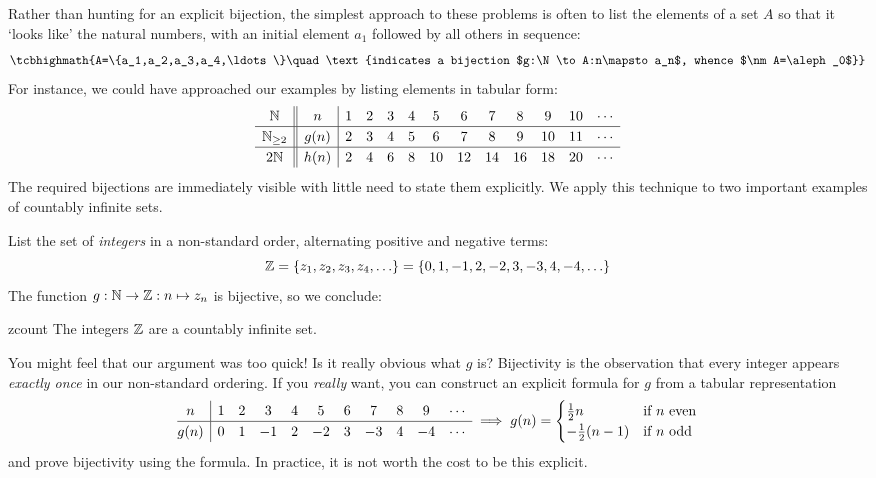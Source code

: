 Rather than hunting for an explicit bijection, the simplest approach to these problems is often to list the elements of a set $A$ so that it `looks like' the natural numbers, with an initial element $a_1$ followed by all others in sequence:
\[
	\tcbhighmath{A=\{a_1,a_2,a_3,a_4,\ldots\}\quad \text{indicates a bijection $g:\N\to A:n\mapsto a_n$, whence $\nm A=\aleph_0$}}
\]
For instance, we could have approached our examples by listing elements in tabular form:
\[
	\def\arraystretch{1.2}
	\begin{array}{c||c|ccccccccccc}
 		\N&n&1&2&3&4&5&6&7&8&9&10&\cdots\\\hline
 		\N_{\ge 2}&g(n)&2&3&4&5&6&7&8&9&10&11&\cdots\\\hline
 		2\N&h(n)&2&4&6&8&10&12&14&16&18&20&\cdots
 	\end{array}
\]
The required bijections are immediately visible with little need to state them explicitly. We apply this technique to two important examples of countably infinite sets.

\goodbreak

List the set of \emph{integers} in a non-standard order, alternating positive and negative terms:
\[
	\mathbb{Z}=\{z_1,z_2,z_3,z_4,\ldots\}=\{0,1,-1,2,-2,3,-3,4,-4,\ldots\}
\]
The function $g:\mathbb{N}\to\mathbb{Z}:n\mapsto z_n$ is bijective, so we conclude:

\begin{thm}{}{zcount}
	The integers $\mathbb{Z}$ are a countably infinite set.
\end{thm}

You might feel that our argument was too quick! Is it really obvious what $g$ is? Bijectivity is the observation that every integer appears \emph{exactly once} in our non-standard ordering. If you \emph{really} want, you can construct an explicit formula for $g$ from a tabular representation
\[
	\begin{array}{@{}c|cccccccccc}
		n&1&2&3&4&5&6&7&8&9&\cdots\\\hline
		g(n)&0&1&-1&2&-2&3&-3&4&-4&\cdots
	\end{array}
	\implies
	g(n)=
	\begin{cases}
		\frac 12n&\text{if $n$ even}\\
		-\frac 12(n-1)&\text{if $n$ odd}
	\end{cases}
\]
and prove bijectivity using the formula. In practice, it is not worth the cost to be this explicit.\smallbreak


